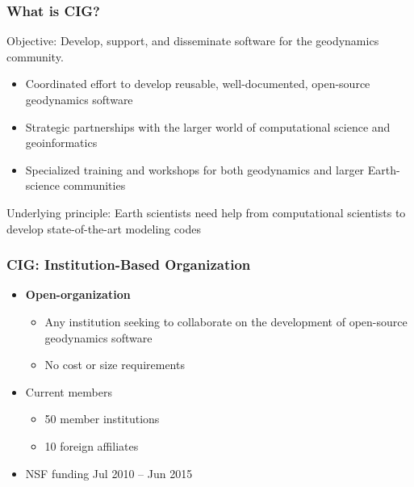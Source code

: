 \documentclass{beamer}
\begin{document}
\begin{frame}
  \frametitle{What is CIG?}
 
  \vfill

  Objective: Develop, support, and disseminate software for the
  geodynamics community.

  \vfill

  \begin{itemize}
  \item Coordinated effort to develop reusable, well-documented,
    open-source geodynamics software
  \item Strategic partnerships with the larger world of
    computational science and geoinformatics
  \item Specialized training and workshops for both geodynamics and
    larger Earth-science communities
  \end{itemize}

  \vfill
 
  Underlying principle: Earth scientists need help from computational
  scientists to develop state-of-the-art modeling codes

\end{frame}


\begin{frame}
  \frametitle{CIG: Institution-Based Organization}
 
  \begin{itemize}
  \item {\bf Open-organization}
    \begin{itemize}
    \item Any institution seeking to collaborate on the development of
      open-source geodynamics software
    \item No cost or size requirements
    \end{itemize}
  \item Current members
    \begin{itemize}
    \item 50 member institutions
    \item 10 foreign affiliates
    \end{itemize}
  \item NSF funding Jul 2010 -- Jun 2015
 \end{itemize}
\end{frame}
\end{document}
